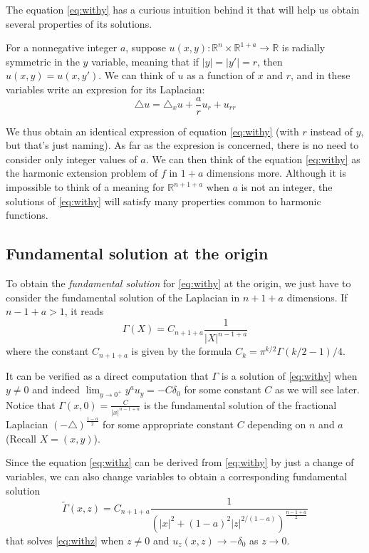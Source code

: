 \documentclass[letterpaper]{article}
\numberwithin{equation}{section}
\newcommand{\abs}[1]{\left\vert#1\right\vert}
\newcommand{\R}{\mathbb R}
\newcommand{\lap} {\triangle}
\begin{document}
The equation \eqref{eq:withy} has a curious intuition behind it that will help us obtain several properties of its solutions.

For a nonnegative integer $a$, suppose $u(x,y) : \R^n \times \R^{1+a} \to \R$ is radially symmetric in the $y$ variable, meaning that if $\abs{y} = \abs{y'} = r$, then $u(x,y) = u(x,y')$. We can think of $u$ as a function of $x$ and $r$, and in these variables write an expresion for its Laplacian:
\[ \lap u =\lap_x u + \frac{a}{r} u_r + u_{rr} \]

We thus obtain an identical expression of equation \eqref{eq:withy} (with $r$ instead of $y$, but that's just naming). As far as the expresion is concerned, there is no need to consider only integer values of $a$. We can then think of the equation \eqref{eq:withy} as the harmonic extension problem of $f$ in $1+a$ dimensions more. Although it is impossible to think of a meaning for $\R^{n+1+a}$ when $a$ is not an integer, the solutions of \eqref{eq:withy} will satisfy many properties common to harmonic functions.

\subsection{Fundamental solution at the origin}
To obtain the \emph{fundamental solution} for \eqref{eq:withy} at the origin, we just have to consider the fundamental solution of the Laplacian in $n+1+a$ dimensions. If $n-1+a > 1$, it reads
\begin{equation}
 \Gamma(X) = C_{n+1+a} \frac{1}{\abs{X}^{n-1+a}}
\end{equation}
where the constant $C_{n+1+a}$ is given by the formula $C_k = \pi^{k/2} \Gamma( k/2 -1) / 4$.

It can be verified as a direct computation that $\Gamma$ is a solution of \eqref{eq:withy} when $y \neq 0$ and indeed $\lim_{y \to 0^+} y^a u_y = -C \delta_0$ for some constant $C$ as we will see later. Notice that $\Gamma(x,0) = \frac{C}{\abs{x}^{n-1+a}}$ is the fundamental solution of the fractional Laplacian $(-\lap)^{\frac{1-a}{2}}$ for some appropriate constant $C$ depending on $n$ and $a$ (Recall $X = (x,y)$).

Since the equation \eqref{eq:withz} can be derived from \eqref{eq:withy} by just a change of variables, we can also change variables to obtain a corresponding fundamental solution
\begin{equation}
 \tilde \Gamma(x,z) = C_{n+1+a} \frac{1}{\left( \abs{x}^2 + (1-a)^2 \abs{z}^{2/(1-a)} \right)^{\frac{n-1+a}{2}}}
\end{equation}
that solves \eqref{eq:withz} when $z \neq 0$ and $u_z(x,z) \to -\delta_0$ as $z \to 0$.
\end{document}
